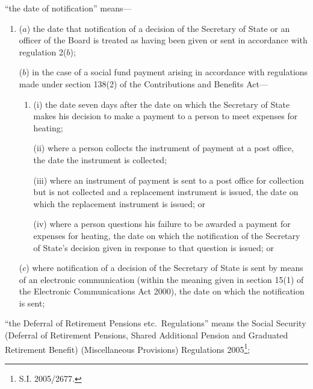 \documentclass[12pt,a4paper]{article}
\begin{document}
\begin{enumerate}
“the date of notification” means—
\begin{enumerate}\item[]
($a$) the date that notification of a decision of the Secretary of State 
or an officer of the Board  %
is treated as having been given or sent in accordance with regulation 2($b$); 

($b$) in the case of a social fund payment arising in accordance with regulations made under section 138(2) of the Contributions and Benefits Act—
\begin{enumerate}\item[]
(i) the date seven days after the date on which the Secretary of State makes his decision to make a payment to a person to meet expenses for heating;

(ii) where a person collects the instrument of payment at a post office, the date the instrument is collected;

(iii) where an instrument of payment is sent to a post office for collection but is not collected and a replacement instrument is issued, the date on which the replacement instrument is issued; or

(iv) where a person questions his failure to be awarded a payment for expenses for heating, the date on which the notification of the Secretary of State’s decision given in response to that question is issued; or
\end{enumerate}

($c$) where notification of a decision of the Secretary of State is sent by means of an electronic communication (within the meaning given in section 15(1) of the Electronic Communications Act 2000), the date on which the notification is sent;
\end{enumerate}

“the Deferral of Retirement Pensions etc.\ Regulations” means the Social Security (Deferral of Retirement Pensions, Shared Additional Pension and Graduated Retirement Benefit) (Miscellaneous Provisions) Regulations 2005\footnote{S.I. 2005/2677.};



\end{enumerate}
\end{document}
